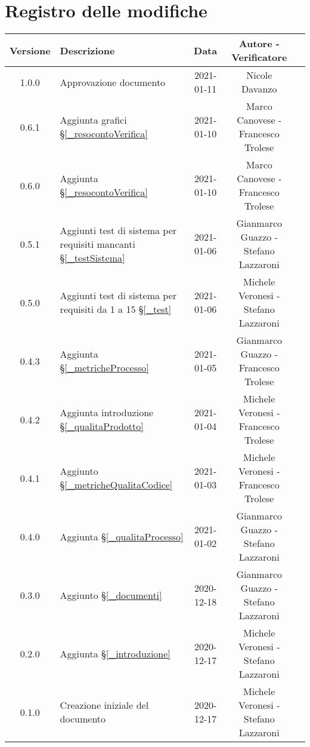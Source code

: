 \section*{Registro delle modifiche}

\begin{center}
	\begin{longtable}{|c|p{5cm}|c|c|c|}
	\hline
	\rowcolor{lighter-grayer}
	\textbf{Versione} & \textbf{Descrizione} & \textbf{Data} & \textbf{Autore - Verificatore} \\
	\hline
	\endfirsthead


	\hline
	1.0.0 & Approvazione documento & 2021-01-11 & Nicole Davanzo \\
	0.6.1 & Aggiunta grafici \S\ref{_resocontoVerifica} & 2021-01-10 & Marco Canovese - Francesco Trolese \\
	0.6.0 & Aggiunta \S\ref{_resocontoVerifica} & 2021-01-10 & Marco Canovese - Francesco Trolese \\
	0.5.1 & Aggiunti test di sistema per requisiti mancanti \S\ref{_testSistema}& 2021-01-06 & Gianmarco Guazzo - Stefano Lazzaroni \\
	0.5.0 & Aggiunti test di sistema per requisiti da 1 a 15 \S\ref{_test}& 2021-01-06 & Michele Veronesi - Stefano Lazzaroni \\
	0.4.3 & Aggiunta \S\ref{_metricheProcesso} & 2021-01-05 & Gianmarco Guazzo - Francesco Trolese \\
	0.4.2 & Aggiunta introduzione \S\ref{_qualitaProdotto}& 2021-01-04 & Michele Veronesi - Francesco Trolese \\
	0.4.1 & Aggiunto \S\ref{_metricheQualitaCodice} & 2021-01-03 & Michele Veronesi - Francesco Trolese \\
	0.4.0 & Aggiunta \S\ref{_qualitaProcesso} & 2021-01-02 & Gianmarco Guazzo - Stefano Lazzaroni \\
	0.3.0 & Aggiunto \S\ref{_documenti} & 2020-12-18 & Gianmarco Guazzo - Stefano Lazzaroni \\
	0.2.0 & Aggiunta \S\ref{_introduzione} & 2020-12-17 &  Michele Veronesi - Stefano Lazzaroni\\
    0.1.0 & Creazione iniziale del documento & 2020-12-17 & Michele Veronesi - Stefano Lazzaroni\\
	\hline

	\end{longtable}
\end{center}